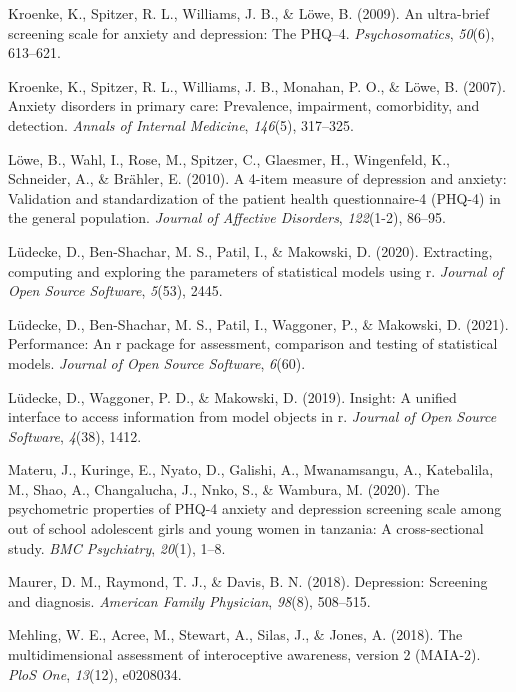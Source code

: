 \documentclass[
  jou,
  longtable,
  nolmodern,
  notxfonts,
  notimes,
  mask,
  colorlinks=true,linkcolor=blue,citecolor=blue,urlcolor=blue]{apa7}
\newlength{\cslhangindent}
\newenvironment{CSLReferences}[2] %
 {\begin{list}{}{%
  \setlength{\itemindent}{0pt}
  \setlength{\leftmargin}{0pt}
  \setlength{\parsep}{0pt}
  \ifodd #1
   \setlength{\leftmargin}{\cslhangindent}
   \setlength{\itemindent}{-1\cslhangindent}
  \fi
  \setlength{\itemsep}{#2\baselineskip}}}
 {\end{list}}
\begin{document}
\begin{CSLReferences}{1}{0}
Kroenke, K., Spitzer, R. L., Williams, J. B., \& Löwe, B. (2009). An
ultra-brief screening scale for anxiety and depression: The PHQ--4.
\emph{Psychosomatics}, \emph{50}(6), 613--621.

Kroenke, K., Spitzer, R. L., Williams, J. B., Monahan, P. O., \& Löwe,
B. (2007). Anxiety disorders in primary care: Prevalence, impairment,
comorbidity, and detection. \emph{Annals of Internal Medicine},
\emph{146}(5), 317--325.

Löwe, B., Wahl, I., Rose, M., Spitzer, C., Glaesmer, H., Wingenfeld, K.,
Schneider, A., \& Brähler, E. (2010). A 4-item measure of depression and
anxiety: Validation and standardization of the patient health
questionnaire-4 (PHQ-4) in the general population. \emph{Journal of
Affective Disorders}, \emph{122}(1-2), 86--95.

Lüdecke, D., Ben-Shachar, M. S., Patil, I., \& Makowski, D. (2020).
Extracting, computing and exploring the parameters of statistical models
using r. \emph{Journal of Open Source Software}, \emph{5}(53), 2445.

Lüdecke, D., Ben-Shachar, M. S., Patil, I., Waggoner, P., \& Makowski,
D. (2021). Performance: An r package for assessment, comparison and
testing of statistical models. \emph{Journal of Open Source Software},
\emph{6}(60).

Lüdecke, D., Waggoner, P. D., \& Makowski, D. (2019). Insight: A unified
interface to access information from model objects in r. \emph{Journal
of Open Source Software}, \emph{4}(38), 1412.

Materu, J., Kuringe, E., Nyato, D., Galishi, A., Mwanamsangu, A.,
Katebalila, M., Shao, A., Changalucha, J., Nnko, S., \& Wambura, M.
(2020). The psychometric properties of PHQ-4 anxiety and depression
screening scale among out of school adolescent girls and young women in
tanzania: A cross-sectional study. \emph{BMC Psychiatry}, \emph{20}(1),
1--8.

Maurer, D. M., Raymond, T. J., \& Davis, B. N. (2018). Depression:
Screening and diagnosis. \emph{American Family Physician}, \emph{98}(8),
508--515.

Mehling, W. E., Acree, M., Stewart, A., Silas, J., \& Jones, A. (2018).
The multidimensional assessment of interoceptive awareness, version 2
(MAIA-2). \emph{PloS One}, \emph{13}(12), e0208034.


\end{CSLReferences}
\end{document}
